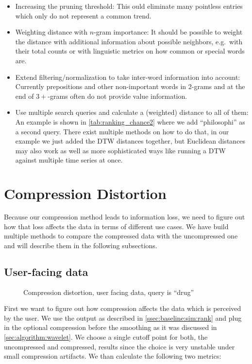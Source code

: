 \begin{itemize}
    \item Increasing the pruning threshold: This ould eliminate many pointless entries which only do not represent a common trend.
    \item Weighting distance with $n$-gram importance: It should be possible to weight the distance with additional information about possible neighbors, e.g.\ with their total counts or with linguistic metrics on how common or special words are.
    \item Extend filtering/normalization to take inter-word information into account: Currently prepositions and other non-important words in $2$-grams and at the end of $3+$-grams often do not provide value information.
    \item Use multiple search queries and calculate a (weighted) distance to all of them: An example is shown in \autoref{tab:ranking_chance2} where we add \enquote{philosophi} as a second query. There exist multiple methods on how to do that, in our example we just added the DTW distances together, but Euclidean distances may also work as well as more sophisticated ways like running a DTW against multiple time series at once.
\end{itemize}



\section{Compression Distortion}
\label{sec:evaluation:distortion}

Because our compression method leads to information loss, we need to figure out how that loss affects the data in terms of different use cases. We have build multiple methods to compare the compressed data with the uncompressed one and will describe them in the following subsections.


\subsection{User-facing data}
\label{ssec:evaluation:distortion:user}

\begin{figure}
    \centering
    
    \caption{Compression distortion, user facing data, query is \enquote{drug}}\label{fig:compression}
\end{figure}

First we want to figure out how compression affects the data which is perceived by the user. We use the output as described in \autoref{ssec:baseline:sim:rank} and plug in the optional compression before the smoothing as it was discussed in \autoref{sec:algorithm:wavelet}. We choose a single cutoff point for both, the uncompressed and compressed, results since the choice is very unstable under small compression artifacts. We than calculate the following two metrics:

